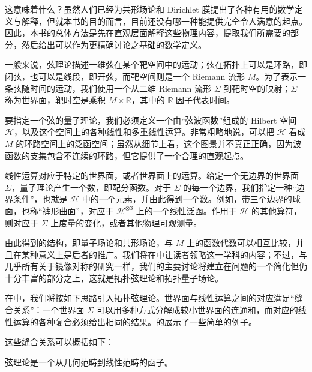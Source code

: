 这意味着什么？虽然人们已经为共形场论和 Dirichlet 膜提出了各种有用的数学定义与解释，但就本书的目的而言，目前还没有哪一种能提供完全令人满意的起点。因此，本书的总体方法是先在直观层面解释这些物理内容，提取我们所需要的部分，然后给出可以作为更精确讨论之基础的数学定义。

一般来说，弦理论描述一维弦在某个靶空间中的运动；弦在拓扑上可以是环路，即闭弦，也可以是线段，即开弦，而靶空间则是一个 Riemann 流形 $M$。为了表示一条弦随时间的运动，我们使用一个从二维 Riemann 流形 $\Sigma$ 到靶时空的映射；$\Sigma$ 称为世界面，靶时空是乘积 $M\times\mathbb{R}$，其中的 $\mathbb{R}$ 因子代表时间。

要指定一个弦的量子理论，我们必须定义一个由“弦波函数”组成的 Hilbert 空间 $\mathcal{H}$，以及这个空间上的各种线性和多重线性运算。非常粗略地说，可以把 $\mathcal{H}$ 看成 $M$ 的环路空间上的泛函空间；虽然从细节上看，这个图景并不真正正确，因为波函数的支集包含不连续的环路，但它提供了一个合理的直观起点。

线性运算对应于特定的世界面，或者世界面上的运算。给定一个无边界的世界面 $\Sigma$，量子理论产生一个数，即配分函数。对于 $\Sigma$ 的每一个边界，我们指定一种“边界条件”，也就是 $\mathcal{H}$ 中的一个元素，并由此得到一个数。例如，带三个边界的球面，也称“裤形曲面”，对应于 $\mathcal{H}^{\otimes3}$ 上的一个线性泛函。作用于 $\mathcal{H}$ 的其他算符，则对应于 $\Sigma$ 上度量的变化，或者其他物理可观测量。

由此得到的结构，即量子场论和共形场论，与 $M$ 上的函数代数可以相互比较，并且在某种意义上是后者的推广。我们将在中让读者领略这一学科的内容；不过，与几乎所有关于镜像对称的研究一样，我们的主要讨论将建立在问题的一个简化但仍十分丰富的部分之上，这就是拓扑弦理论和拓扑量子场论。

在中，我们将按如下思路引入拓扑弦理论。世界面与线性运算之间的对应满足“缝合关系”：一个世界面 $\Sigma$ 可以用多种方式分解成较小世界面的连通和，而对应的线性运算的各种复合必须给出相同的结果。的展示了一些简单的例子。

这些缝合关系可以概括如下：

\begin{definition}\label{def:1.1}
弦理论是一个从几何范畴到线性范畴的函子。
\end{definition}

